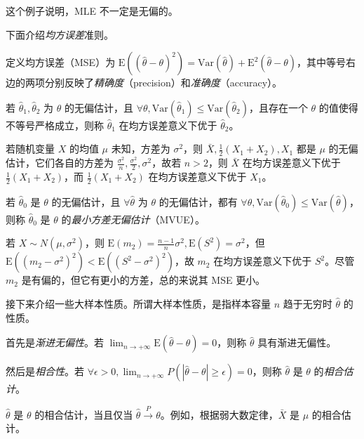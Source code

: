 \documentclass[../main.tex]{subfiles}
\begin{document}
这个例子说明，MLE 不一定是无偏的。

下面介绍\emph{均方误差}准则。

定义均方误差（MSE）为 $\mathrm E((\hat\theta-\theta)^2)=\mathrm{Var}(\hat\theta)+\mathrm E^2(\hat\theta-\theta)$，其中等号右边的两项分别反映了\emph{精确度}（precision）和\emph{准确度}（accuracy）。

\begin{definition}\label{def:6.3.2}
    若 $\hat\theta_1,\hat\theta_2$ 为 $\theta$ 的无偏估计，且 $\forall\theta,\mathrm{Var}(\hat\theta_1)\leq\mathrm{Var}(\hat\theta_2)$，且存在一个 $\theta$ 的值使得不等号严格成立，则称 $\hat\theta_1$ 在均方误差意义下优于 $\hat\theta_2$。
\end{definition}

\begin{example}
    若随机变量 $X$ 的均值 $\mu$ 未知，方差为 $\sigma^2$，则 $\bar X,\frac12(X_1+X_2),X_1$ 都是 $\mu$ 的无偏估计，它们各自的方差为 $\frac{\sigma^2}n,\frac{\sigma^2}2,\sigma^2$，故若 $n>2$，则 $\bar X$ 在均方误差意义下优于 $\frac12(X_1+X_2)$，而 $\frac12(X_1+X_2)$ 在均方误差意义下优于 $X_1$。
\end{example}

\begin{definition}\label{def:6.3.3}
    若 $\hat\theta_0$ 是 $\theta$ 的无偏估计，且 $\forall\hat\theta$ 为 $\theta$ 的无偏估计，都有 $\forall\theta,\mathrm{Var}(\hat\theta_0)\leq\mathrm{Var}(\hat\theta)$，则称 $\hat\theta_0$ 是 $\theta$ 的\emph{最小方差无偏估计}（MVUE）。
\end{definition}

\begin{example}
    若 $X\sim N(\mu,\sigma^2)$，则 $\mathrm E(m_2)=\frac{n-1}n\sigma^2,\mathrm E(S^2)=\sigma^2$，但 $\mathrm E((m_2-\sigma^2)^2)<\mathrm E((S^2-\sigma^2)^2)$，故 $m_2$ 在均方误差意义下优于 $S^2$。尽管 $m_2$ 是有偏的，但它有更小的方差，总的来说其 MSE 更小。
\end{example}

接下来介绍一些大样本性质。所谓大样本性质，是指样本容量 $n$ 趋于无穷时 $\hat\theta$ 的性质。

首先是\emph{渐进无偏性}。若 $\lim_{n\rightarrow+\infty}\mathrm E(\hat\theta-\theta)=0$，则称 $\hat\theta$ 具有渐进无偏性。

然后是\emph{相合性}。若 $\forall\epsilon>0,\lim_{n\rightarrow+\infty}P(|\hat\theta-\theta|\geq\epsilon)=0$，则称 $\hat\theta$ 是 $\theta$ 的\emph{相合估计}。

$\hat\theta$ 是 $\theta$ 的相合估计，当且仅当 $\hat\theta\overset{P}\rightarrow\theta$。例如，根据弱大数定律，$\bar X$ 是 $\mu$ 的相合估计。
\end{document}

